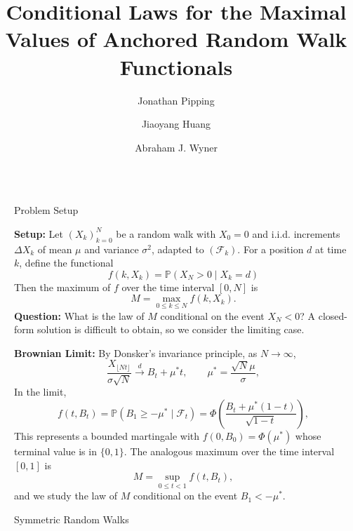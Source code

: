 \documentclass[final]{beamer}
\title{Conditional Laws for the Maximal Values of Anchored Random Walk Functionals}
\author{Jonathan Pipping \and Jiaoyang Huang \and Abraham J. Wyner}
\institute[shortinst]{University of Pennsylvania, Department of Statistics \& Data Science}
\newlength{\sepwidth}
\newlength{\colwidth}
\newcommand{\separatorcolumn}{\begin{column}{\sepwidth}\end{column}}
\begin{document}
\begin{frame}[t]
\begin{columns}[t]
\separatorcolumn

\begin{column}{\colwidth}

  \begin{block}{Problem Setup}

    \textbf{Setup:} Let $(X_k)_{k=0}^N$ be a random walk with $X_0=0$ and i.i.d. increments $\Delta X_k$ of mean $\mu$ and variance $\sigma^2$, adapted to $(\mathcal F_k)$. For a position $d$ at time $k$, define the functional
    \begin{equation*}
        f(k, X_k) = \mathbb{P}(X_N > 0 \mid X_k = d)
    \end{equation*}
    Then the maximum of $f$ over the time interval $[0,N]$ is
    \begin{equation*}
        M = \max_{0\le k\le N} f(k,X_k).
    \end{equation*}
    \textbf{Question:} What is the law of $M$ conditional on the event $X_N<0$? A closed-form solution is difficult to obtain, so we consider the limiting case.

    \textbf{Brownian Limit:} By Donsker's invariance principle, as $N\to\infty$,
    \begin{equation*}
        \frac{X_{\lfloor Nt \rfloor}}{\sigma\sqrt{N}} \xrightarrow{d} B_t + \mu^* t, \qquad \mu^* = \frac{\sqrt{N}\mu}{\sigma},
    \end{equation*}
    In the limit,
    \begin{equation*}
        f(t,B_t) = \mathbb{P}(B_1 \ge -\mu^* \mid \mathcal F_t) = \Phi\!\left(\frac{B_t+\mu^*(1-t)}{\sqrt{1-t}}\right),
    \end{equation*}
    This represents a bounded martingale with $f(0,B_0)=\Phi(\mu^*)$ whose terminal value is in $\{0,1\}$. The analogous maximum over the time interval $[0,1]$ is
    \begin{equation*}
        M = \sup_{0\le t < 1} f(t,B_t),
    \end{equation*}
    and we study the law of $M$ conditional on the event $B_1 < -\mu^*$.
  \end{block}

  \begin{block}{Symmetric Random Walks}


\end{block}
\end{column}
\end{columns}
\end{frame}
\end{document}

